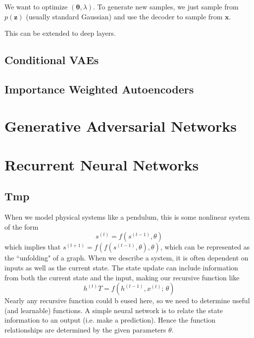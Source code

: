 \documentclass{article}
\theoremstyle{definition}
\theoremstyle{remark}
\theoremstyle{definition}
\begin{document}
We want to optimize $(\boldsymbol{\theta}, \lambda)$. To generate new samples, we just sample from $p(\mathbf{z})$ (usually standard Gaussian) and use the decoder to sample from $\mathbf{x}$.  

This can be extended to deep layers. 



\subsection{Conditional VAEs}

\subsection{Importance Weighted Autoencoders}


\section{Generative Adversarial Networks}



\section{Recurrent Neural Networks}

\subsection{Tmp} 

When we model physical systems like a pendulum, this is some nonlinear system of the form
\[s^{(t)} = f(s^{(t - 1)}, \theta)\]
which implies that $s^{(t+1)} = f(f(s^{(t-1)}, \theta), \theta)$, which can be represented as the ``unfolding" of a graph. When we describe a system, it is often dependent on inputs as well as the current state. The state update can include information from both the current state and the input, making our recursive function like 
\[h^{(t)} T= f(h^{(t-1)}, x^{(t)}; \, \theta)\] 
Nearly any recursive function could b eused here, so we need to determine useful (and learnable) functions. A simple neural network is to relate the state information to an output (i.e. make a prediction). Hence the function relationships are determined by the given parameters $\theta$.
\end{document}
